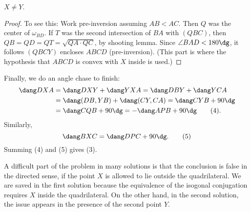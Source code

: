 \begin{claim*}
  $X \neq Y$.
\end{claim*}
\begin{proof}
  To see this: Work pre-inversion assuming $AB < AC$.
  Then $Q$ was the center of $\omega_{BD}$.
  If $T$ was the second intersection of $BA$ with $(QBC)$,
  then $QB = QD = QT = \sqrt{QA \cdot QC}$, by shooting lemma.
  Since $\angle BAD < 180\dg$,
  it follows $(QBCY)$ encloses $ABCD$ (pre-inversion).
  (This part is where the hypothesis that
  $ABCD$ is convex with $X$ inside is used.)
\end{proof}

Finally, we do an angle chase to finish:
\begin{align*}
  \dang DXA &= \dang DXY + \dang YXA = \dang DBY + \dang YCA \\
  &= \dang (DB, YB) + \dang (CY, CA) = \dang CYB + 90\dg \\
  &= \dang CQB + 90\dg = -\dang APB + 90\dg \tag{4}.
\end{align*}
Similarly,
\[ \dang BXC = \dang DPC + 90\dg. \tag{5} \]
Summing (4) and (5) gives (3).


\begin{remark*}
  A difficult part of the problem in many solutions
  is that the conclusion is false in the directed sense,
  if the point $X$ is allowed to lie outside the quadrilateral.
  We are saved in the first solution because the equivalence
  of the isogonal conjugation requires $X$ inside the quadrilateral.
  On the other hand, in the second solution,
  the issue appears in the presence of the second point $Y$.
\end{remark*}
\pagebreak



